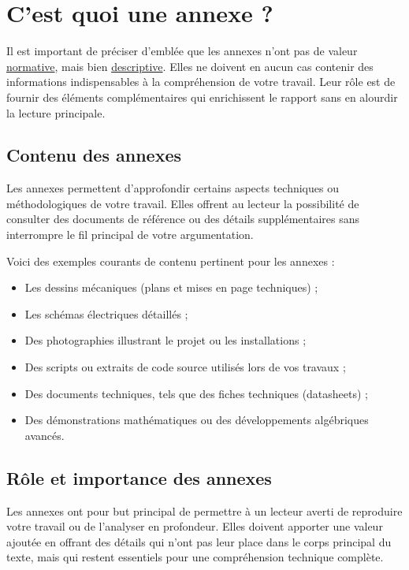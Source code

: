 \chapter{C'est quoi une annexe ?}

Il est important de préciser d'emblée que les annexes n'ont pas de valeur \underline{normative}, mais bien \underline{descriptive}. Elles ne doivent en aucun cas contenir des informations indispensables à la compréhension de votre travail. Leur rôle est de fournir des éléments complémentaires qui enrichissent le rapport sans en alourdir la lecture principale.

\section{Contenu des annexes}

Les annexes permettent d'approfondir certains aspects techniques ou méthodologiques de votre travail. Elles offrent au lecteur la possibilité de consulter des documents de référence ou des détails supplémentaires sans interrompre le fil principal de votre argumentation.

Voici des exemples courants de contenu pertinent pour les annexes :

\begin{itemize}
    \item Les dessins mécaniques (plans et mises en page techniques) ;
    \item Les schémas électriques détaillés ;
    \item Des photographies illustrant le projet ou les installations ;
    \item Des scripts ou extraits de code source utilisés lors de vos travaux ;
    \item Des documents techniques, tels que des fiches techniques (datasheets) ;
    \item Des démonstrations mathématiques ou des développements algébriques avancés.
\end{itemize}

\section{Rôle et importance des annexes}

Les annexes ont pour but principal de permettre à un lecteur averti de reproduire votre travail ou de l'analyser en profondeur. Elles doivent apporter une valeur ajoutée en offrant des détails qui n'ont pas leur place dans le corps principal du texte, mais qui restent essentiels pour une compréhension technique complète.

